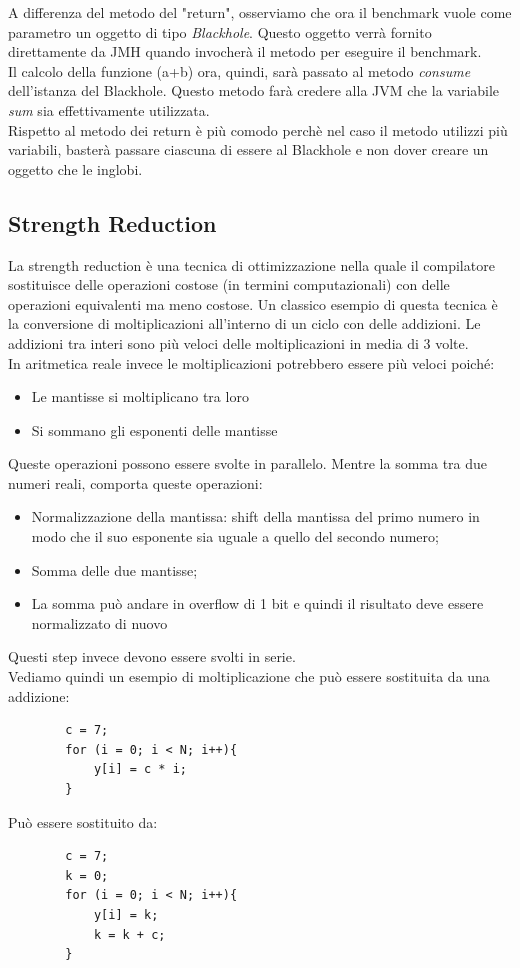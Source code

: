 \documentclass[a4paper, 11pt,            %
openright,               %
italian,
english                 
]{article}       %
\begin{document}
	A differenza del metodo del "return", osserviamo che ora il benchmark vuole come parametro un oggetto di tipo \textit{Blackhole}. Questo oggetto verrà fornito direttamente da JMH quando invocherà il metodo per eseguire il benchmark. \\ 
	Il calcolo della funzione (a+b) ora, quindi, sarà passato al metodo \textit{consume} dell'istanza del Blackhole. Questo metodo farà credere alla JVM che la variabile \textit{sum} sia effettivamente utilizzata. \\
	Rispetto al metodo dei return è più comodo perchè nel caso il metodo utilizzi più variabili, basterà passare ciascuna di essere al Blackhole e non dover creare un oggetto che le inglobi.
	
	
	\subsection{Strength Reduction}
	La strength reduction è una tecnica di ottimizzazione nella quale il compilatore sostituisce delle operazioni costose (in termini computazionali) con delle operazioni equivalenti ma meno costose. Un classico esempio di questa tecnica è la conversione di moltiplicazioni all'interno di un ciclo con delle addizioni. Le addizioni tra interi sono più veloci delle moltiplicazioni in media di 3 volte.\\
	In aritmetica reale invece le moltiplicazioni potrebbero essere più veloci poiché:
	\begin{itemize}
		\item Le mantisse si moltiplicano tra loro 
		\item Si sommano gli esponenti delle mantisse
	\end{itemize}
	Queste operazioni possono essere svolte in parallelo.
	Mentre la somma tra due numeri reali, comporta queste operazioni:
	\begin{itemize}
		\item Normalizzazione della mantissa: shift della mantissa del primo numero in modo che il suo esponente sia uguale a quello del secondo numero;
		\item Somma delle due mantisse;
		\item La somma può andare in overflow di 1 bit e quindi il risultato deve essere normalizzato di nuovo
	\end{itemize}
	Questi step invece devono essere svolti in serie.\\
	Vediamo quindi un esempio di moltiplicazione che può essere sostituita da una addizione:
	\begin{lstlisting}
		c = 7;
		for (i = 0; i < N; i++){
			y[i] = c * i;
		}
	\end{lstlisting}
	Può essere sostituito da:
	\begin{lstlisting}
		c = 7;
		k = 0;
		for (i = 0; i < N; i++){
			y[i] = k;
			k = k + c;
		}
	\end{lstlisting}
	
\end{document}
